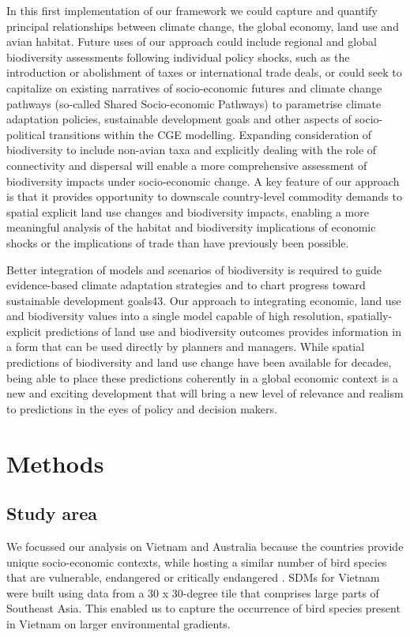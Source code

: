 \documentclass[titlesmallcaps,copyrightpage]{uomthesis}\usepackage[]{graphicx}\usepackage[]{color}
\begin{document}
In this first implementation of our framework we could capture and quantify principal relationships between climate change, the global economy, land use and avian habitat. Future uses of our approach could include regional and global biodiversity assessments following individual policy shocks, such as the introduction or abolishment of taxes or international trade deals, or could seek to capitalize on existing narratives of socio-economic futures and climate change pathways (so-called Shared Socio-economic Pathways) \citep{van_vuuren_climate_2014} to parametrise climate adaptation policies, sustainable development goals and other aspects of socio-political transitions within the CGE modelling. Expanding consideration of biodiversity to include non-avian taxa and explicitly dealing with the role of connectivity and dispersal will enable a more comprehensive assessment of biodiversity impacts under socio-economic change. A key feature of our approach is that it provides opportunity to downscale country-level commodity demands to spatial explicit land use changes and biodiversity impacts, enabling a more meaningful analysis of the habitat and biodiversity implications of economic shocks or the implications of trade than have previously been possible. 

Better integration of models and scenarios of biodiversity is required to guide evidence-based climate adaptation strategies and to chart progress toward sustainable development goals43. Our approach to integrating economic, land use and biodiversity values into a single model capable of high resolution, spatially-explicit predictions of land use and biodiversity outcomes provides information in a form that can be used directly by planners and managers. While spatial predictions of biodiversity and land use change have been available for decades, being able to place these predictions coherently in a global economic context is a new and exciting development that will bring a new level of relevance and realism to predictions in the eyes of policy and decision makers.

\section{Methods}
\subsection{Study area} 
We focussed our analysis on Vietnam and Australia because the countries provide unique socio-economic contexts, while hosting a similar number of bird species that are vulnerable, endangered or critically endangered \citep{birdlife_international_country_2018, birdlife_international_country_2018-1}. SDMs for Vietnam were built using data from a 30 x 30-degree tile that comprises large parts of Southeast Asia. This enabled us to capture the occurrence of bird species present in Vietnam on larger environmental gradients.
\end{document}
